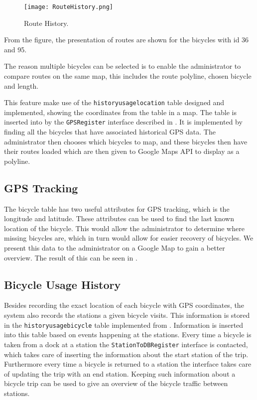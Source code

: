 \begin{figure}[H]
	\centering
	\texttt{[image: RouteHistory.png]}
	\caption{Route History.}
	\label{fig:routehistory}
\end{figure}

From the figure, the presentation of routes are shown for the bicycles with id 36 and 95.

The reason multiple bicycles can be selected is to enable the administrator to compare routes on the same map, this includes the route polyline, chosen bicycle and length.

This feature make use of the \texttt{historyusagelocation} table designed and implemented, showing the coordinates from the table in a map.
The table is inserted into by the \texttt{GPSRegister} interface described in .
It is implemented by finding all the bicycles that have associated historical GPS data.
The administrator then chooses which bicycles to map, and these bicycles then have their routes loaded which are then given to Google Maps API to display as a polyline.

\subsection{GPS Tracking}\label{sec:gpsHistory}
The bicycle table has two useful attributes for GPS tracking, which is the longitude and latitude.
These attributes can be used to find the last known location of the bicycle. 
This would allow the administrator to determine where missing bicycles are, which in turn would allow for easier recovery of bicycles.
We present this data to the administrator on a Google Map to gain a better overview.
The result of this can be seen in .

\subsection{Bicycle Usage History}\label{sec:bicycleUsageHistory}

Besides recording the exact location of each bicycle with GPS coordinates, the system also records the stations a given bicycle visits.
This information is stored in the \texttt{historyusagebicycle} table implemented from .
Information is inserted into this table based on events happening at the stations. 
Every time a bicycle is taken from a dock at a station the \texttt{StationToDBRegister} interface is contacted, which takes care of inserting the information about the start station of the trip.
Furthermore every time a bicycle is returned to a station the interface takes care of updating the trip with an end station.
Keeping such information about a bicycle trip can be used to give an overview of the bicycle traffic between stations.

